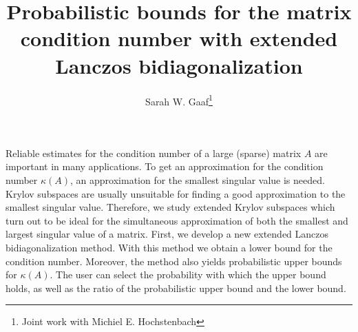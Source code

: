 \documentclass{article}
\title{Probabilistic bounds for the matrix condition number with extended Lanczos bidiagonalization}
\author{Sarah W. Gaaf\thanks{Joint work with Michiel E. Hochstenbach}}
\affil{PhD student at Eindhoven University of Technology}
\date{}
\begin{document}
\maketitle
\setcounter{page}{16}
Reliable estimates for the condition number of a large (sparse) matrix $A$ are important in many applications.
To get an approximation for the condition number $\kappa(A)$, an approximation for the smallest
singular value is needed. Krylov subspaces are usually unsuitable for finding a good approximation
to the smallest singular value.
Therefore, we study extended Krylov subspaces which turn out to be ideal for the simultaneous
approximation of both the smallest and largest singular value of a matrix.
First, we develop a new extended Lanczos bidiagonalization method.
With this method we obtain a lower bound for the condition number.
Moreover, the method also yields probabilistic upper bounds for $\kappa(A)$.
The user can select the probability with which the upper bound holds,
as well as the ratio of the probabilistic upper bound and the lower bound.
\end{document}
